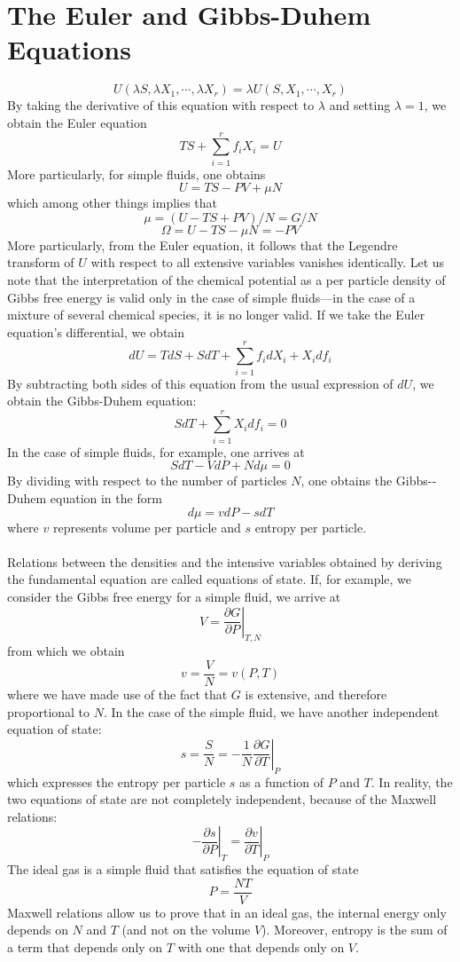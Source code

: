 \documentclass[cyan]{elegantnote}
\begin{document}
\section{The Euler and Gibbs-­Duhem Equations}
\[U(\lambda S, \lambda X_1, \cdots, \lambda X_r) = \lambda U(S,X_1,\cdots,X_r)\]
By taking the derivative of this equation with respect to $\lambda$ and setting $\lambda = 1$, we obtain the Euler equation
\[TS + \sum_{i=1}^{r} f_i X_i = U\]
More particularly, for simple fluids, one obtains
\[U = TS - PV + \mu N\]
which among other things implies that
\[\mu = (U - TS + PV)/N = G/N\]
\[\Omega = U - TS - \mu N = -PV\]
More particularly, from the Euler equation, it follows that the Legendre transform of $U$ with respect to all extensive variables vanishes identically. Let us note that the interpretation of the chemical potential as a per particle density of Gibbs free energy is valid only in the case of simple fluids—in the case of a mixture of several chemical species, it is no longer valid.
If we take the Euler equation's differential, we obtain
\[dU = TdS + SdT + \sum_{i=1}^r f_idX_i + X_i df_i\]
By subtracting both sides of this equation from the usual expression of $dU$, we obtain the Gibbs-­Duhem equation:
\[SdT + \sum_{i=1}^{r}X_idf_i = 0\]
In the case of simple fluids, for example, one arrives at
\[SdT -VdP + Nd\mu = 0\]
By dividing with respect to the number of particles $N$, one obtains the Gibbs-­Duhem equation in the form
\[d\mu = vdP -sdT\]
where $v$ represents volume per particle and $s$ entropy per particle.
\\ \\
Relations between the densities and the intensive variables obtained by deriving the fundamental equation are called equations of state.
If, for example, we consider the Gibbs free energy for a simple fluid, we arrive at
\[ V = \left. \frac{\partial G}{\partial P} \right|_{T,N}\]
from which we obtain
\[v = \frac{V}{N} = v(P,T)\]
where we have made use of the fact that $G$ is extensive, and therefore proportional to $N$.
In the case of the simple fluid, we have another independent equation of state:
\[s = \frac{S}{N} = -\frac{1}{N}  \left. \frac{\partial G}{\partial T} \right|_{P}\]
which expresses the entropy per particle $s$ as a function of $P$ and $T$. In reality, the two equations of state are not completely independent, because of the Maxwell relations:
\[\left. -\frac{\partial s}{\partial P} \right|_{T} = \left. \frac{\partial v}{\partial T} \right|_{P}\]
The ideal gas is a simple fluid that satisfies the equation of state
\[P = \frac{NT}{V}\]
Maxwell relations allow us to prove that in an ideal gas, the internal energy only depends on $N$ and $T$ (and not on the volume $V$). Moreover, entropy is the sum of a term that depends only on $T$ with one that depends only
on $V$.
\end{document}
